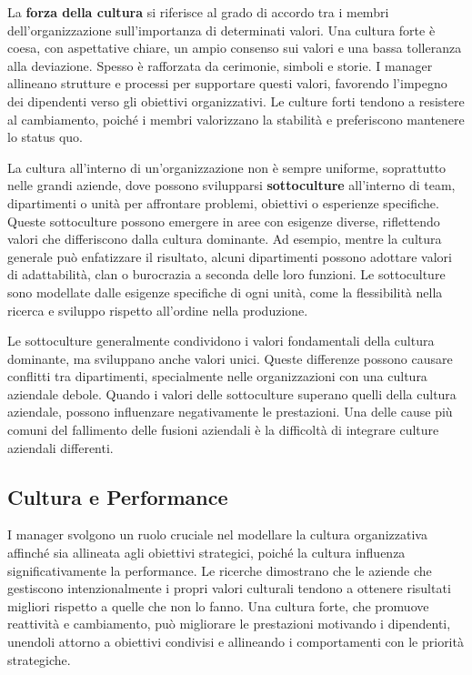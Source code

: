 \documentclass{article}
\begin{document}
La \textbf{forza della cultura} si riferisce al grado di accordo tra i membri dell'organizzazione sull'importanza di determinati valori. Una cultura forte è coesa, con aspettative chiare, un ampio consenso sui valori e una bassa tolleranza alla deviazione. Spesso è rafforzata da cerimonie, simboli e storie. I manager allineano strutture e processi per supportare questi valori, favorendo l'impegno dei dipendenti verso gli obiettivi organizzativi. Le culture forti tendono a resistere al cambiamento, poiché i membri valorizzano la stabilità e preferiscono mantenere lo status quo.

La cultura all'interno di un'organizzazione non è sempre uniforme, soprattutto nelle grandi aziende, dove possono svilupparsi \textbf{sottoculture} all'interno di team, dipartimenti o unità per affrontare problemi, obiettivi o esperienze specifiche. Queste sottoculture possono emergere in aree con esigenze diverse, riflettendo valori che differiscono dalla cultura dominante. Ad esempio, mentre la cultura generale può enfatizzare il risultato, alcuni dipartimenti possono adottare valori di adattabilità, clan o burocrazia a seconda delle loro funzioni. Le sottoculture sono modellate dalle esigenze specifiche di ogni unità, come la flessibilità nella ricerca e sviluppo rispetto all'ordine nella produzione.

Le sottoculture generalmente condividono i valori fondamentali della cultura dominante, ma sviluppano anche valori unici. Queste differenze possono causare conflitti tra dipartimenti, specialmente nelle organizzazioni con una cultura aziendale debole. Quando i valori delle sottoculture superano quelli della cultura aziendale, possono influenzare negativamente le prestazioni. Una delle cause più comuni del fallimento delle fusioni aziendali è la difficoltà di integrare culture aziendali differenti.

\subsection{Cultura e Performance}

I manager svolgono un ruolo cruciale nel modellare la cultura organizzativa affinché sia allineata agli obiettivi strategici, poiché la cultura influenza significativamente la performance. Le ricerche dimostrano che le aziende che gestiscono intenzionalmente i propri valori culturali tendono a ottenere risultati migliori rispetto a quelle che non lo fanno. Una cultura forte, che promuove reattività e cambiamento, può migliorare le prestazioni motivando i dipendenti, unendoli attorno a obiettivi condivisi e allineando i comportamenti con le priorità strategiche.
\end{document}

